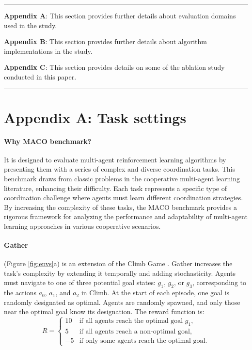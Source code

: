 

\noindent\rule{\linewidth}{1pt}

\noindent \textbf{Appendix A}: This section provides further details about evaluation domains used in the study. 

\noindent \textbf{Appendix B}: This section provides further details about algorithm implementations in the study. 

\noindent \textbf{Appendix C}: This section provides details on some of the ablation study conducted in this paper. 

\noindent\rule{\linewidth}{1pt} 

\section*{Appendix A: Task settings} 

\paragraph{Why MACO benchmark?} \cite{wang2022contextaware} It is designed to evaluate multi-agent reinforcement learning algorithms by presenting them with a series of complex and diverse coordination tasks. This benchmark draws from classic problems in the cooperative multi-agent learning literature, enhancing their difficulty. Each task represents a specific type of coordination challenge where agents must learn different coordination strategies. By increasing the complexity of these tasks, the MACO benchmark provides a rigorous framework for analyzing the performance and adaptability of multi-agent learning approaches in various cooperative scenarios. 

\paragraph{Gather} (Figure \ref{fig:envs}a) is an extension of the Climb Game \cite{wei2016lenient}. Gather increases the task's complexity by extending it temporally and adding stochasticity. Agents must navigate to one of three potential goal states: \( g_1 \), \( g_2 \), or \( g_3 \), corresponding to the actions \( a_0 \), \( a_1 \), and \( a_2 \) in Climb. At the start of each episode, one goal is randomly designated as optimal. Agents are randomly spawned, and only those near the optimal goal know its designation. The reward function is:\[R = 
\begin{cases} 
10 & \text{if all agents reach the optimal goal } g_1, \\
5 & \text{if all agents reach a non-optimal goal}, \\
-5 & \text{if only some agents reach the optimal goal}.
\end{cases}
\]

